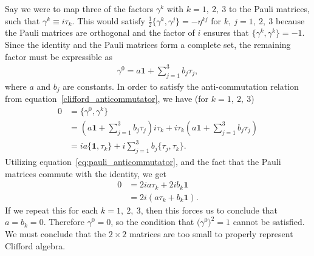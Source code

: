 \documentclass[titlepage,letterpaper,onecolumn,11pt,final]{report}
\newcommand{\gama}{\gamma^{0}}
\numberwithin{equation}{section}
\numberwithin{figure}{section}
\begin{document}
Say we were to map three of the factors $\gamma^{k}$ with $k=1,\ 2,\ 3$ to the Pauli matrices, such that $\gamma^{k} \equiv i \tau_{k}$. This would satisfy $\frac{1}{2} \{ \gamma^{k}, \gamma^{j} \} = - \eta^{k j}$ for $k,\ j = 1,\ 2,\ 3$ because the Pauli matrices are orthogonal and the factor of $i$ ensures that $\{ \gamma^{k}, \gamma^{k} \} = -1$. Since the identity and the Pauli matrices form a complete set, the remaining factor must be expressible as
\begin{gather}
	\gama = a \mathbf{1} + \sum_{j = 1}^{3}{b_{j} \tau_{j}} ,
\end{gather}
where $a$ and $b_{j}$ are constants. In order to satisfy the anti-commutation relation from equation~\ref{clifford_anticommutator}, we have (for $k = 1,\ 2,\ 3$)
\begin{equation}
	\begin{split}
	0 &= \{ \gama, \gamma^{k} \} \\
	&= \left( a \mathbf{1} + \sum_{j = 1}^{3}{b_{j} \tau_{j}} \right) i \tau_{k} + i \tau_{k} \left( a \mathbf{1} + \sum_{j = 1}^{3}{b_{j} \tau_{j}} \right) \\
	&= i a \{ \mathbf{1} , \tau_{k} \} + i \sum_{j = 1}^{3}{ b_{j} \{ \tau_{j} , \tau_{k} \}} .
	\end{split}
\end{equation}
%
Utilizing equation~\ref{eq:pauli_anticommutator}, and the fact that the Pauli matrices commute with the identity, we get
\begin{equation}
	\begin{split}
	0 &= 2 i a \tau_{k} + 2 i b_{k} \mathbf{1} \\
	 &= 2 i (a \tau_{k} +  b_{k} \mathbf{1} ).
	\end{split}
\end{equation}
%
If we repeat this for each $k = 1,\ 2,\ 3$, then this forces us to conclude that $a = b_{k} = 0$. Therefore $\gama = 0$, so the condition that $\big( \gama \big)^{2} = 1$ cannot be satisfied. We must conclude that the $2 \times 2$ matrices are too small to properly represent Clifford algebra. 
\end{document}
